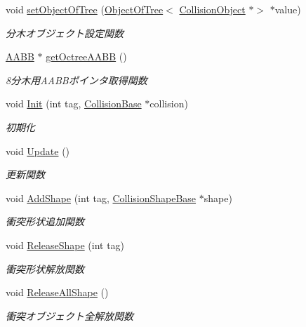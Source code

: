 \begin{DoxyCompactItemize}
void \mbox{\hyperlink{class_collision_object_ad95d376f91556186485040acfd15c578}{set\+Object\+Of\+Tree}} (\mbox{\hyperlink{class_object_of_tree}{Object\+Of\+Tree}}$<$ \mbox{\hyperlink{class_collision_object}{Collision\+Object}} $\ast$$>$ $\ast$value)
\begin{DoxyCompactList}\small\item\em 分木オブジェクト設定関数 \end{DoxyCompactList}\item 
\mbox{\hyperlink{class_a_a_b_b}{A\+A\+BB}} $\ast$ \mbox{\hyperlink{class_collision_object_ae67df28ab2e9247ad0ea22be91d4e08c}{get\+Octree\+A\+A\+BB}} ()
\begin{DoxyCompactList}\small\item\em 8分木用\+A\+A\+B\+Bポインタ取得関数 \end{DoxyCompactList}\item 
void \mbox{\hyperlink{class_collision_object_abcbde76cbf735d4a51ea20465198bed3}{Init}} (int tag, \mbox{\hyperlink{class_collision_base}{Collision\+Base}} $\ast$collision)
\begin{DoxyCompactList}\small\item\em 初期化 \end{DoxyCompactList}\item 
void \mbox{\hyperlink{class_collision_object_a64d8242bb2f63730f94cece00fc5130e}{Update}} ()
\begin{DoxyCompactList}\small\item\em 更新関数 \end{DoxyCompactList}\item 
void \mbox{\hyperlink{class_collision_object_a88de22ae14ac514d6b32b466df824482}{Add\+Shape}} (int tag, \mbox{\hyperlink{class_collision_shape_base}{Collision\+Shape\+Base}} $\ast$shape)
\begin{DoxyCompactList}\small\item\em 衝突形状追加関数 \end{DoxyCompactList}\item 
void \mbox{\hyperlink{class_collision_object_a0befc2a8eeb87abe7c9e944c80335e81}{Release\+Shape}} (int tag)
\begin{DoxyCompactList}\small\item\em 衝突形状解放関数 \end{DoxyCompactList}\item 
void \mbox{\hyperlink{class_collision_object_a779b627a233b7b47346214a75b392ed6}{Release\+All\+Shape}} ()
\begin{DoxyCompactList}\small\item\em 衝突オブジェクト全解放関数 \end{DoxyCompactList}\end{DoxyCompactItemize}
